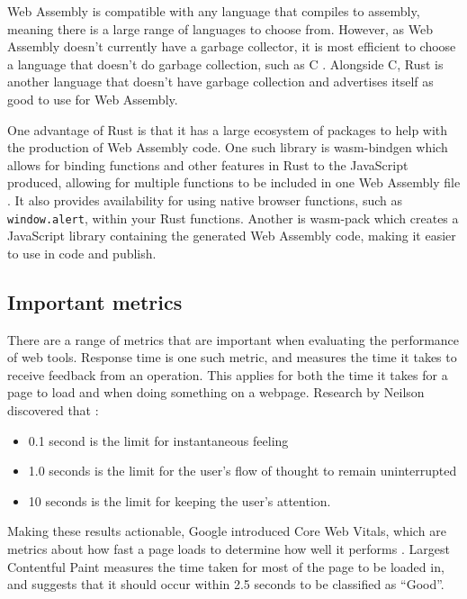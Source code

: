 \documentclass[12pt,a4paper]{article}
\begin{document}
Web Assembly is compatible with any language that compiles to assembly, meaning there is a large range of languages to choose from. However, as Web Assembly doesn't currently have a garbage collector, it is most efficient to choose a language that doesn't do garbage collection, such as C \cite{haas2017bringing}. Alongside C, Rust is another language that doesn't have garbage collection and advertises itself as good to use for Web Assembly.

One advantage of Rust is that it has a large ecosystem of packages to help with the production of Web Assembly code. One such library is wasm-bindgen which allows for binding functions and other features in Rust to the JavaScript produced, allowing for multiple functions to be included in one Web Assembly file \cite{wasmbindgen}. It also provides availability for using native browser functions, such as \texttt{window.alert}, within your Rust functions. Another is wasm-pack which creates a JavaScript library containing the generated Web Assembly code, making it easier to use in code and publish.


\subsection{Important metrics}

There are a range of metrics that are important when evaluating the performance of web tools. Response time is one such metric, and measures the time it takes to receive feedback from an operation. This applies for both the time it takes for a page to load and when doing something on a webpage. Research by Neilson discovered that \cite{nielsen1994usability}:
\begin{itemize}
    \item 0.1 second is the limit for instantaneous feeling
    \item 1.0 seconds is the limit for the user's flow of thought to remain uninterrupted
    \item 10 seconds is the limit for keeping the user's attention.
\end{itemize}

Making these results actionable, Google introduced Core Web Vitals, which are metrics about how fast a page loads to determine how well it performs \cite{webvitals}. Largest Contentful Paint measures the time taken for most of the page to be loaded in, and suggests that it should occur within 2.5 seconds to be classified as “Good”.
\end{document}

